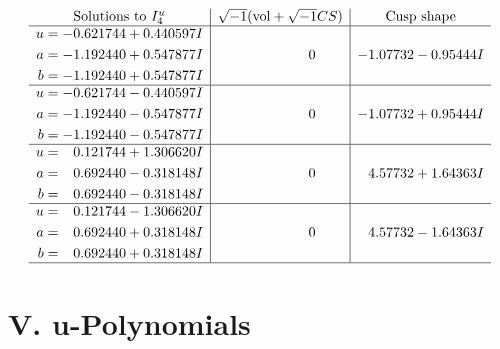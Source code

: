 \documentclass[1p]{elsarticle_modified}
\theoremstyle{definition}
\newcommand{\I}{\sqrt{-1}}
\begin{document}
$$\begin{array}{c|c|c}  
\text{Solutions to }I^u_{4}& \I (\text{vol} + \sqrt{-1}CS) & \text{Cusp shape}\\
 \hline 
\begin{aligned}
u &= -0.621744 + 0.440597 I \\
a &= -1.192440 + 0.547877 I \\
b &= -1.192440 + 0.547877 I\end{aligned}
 & \phantom{-0.000000 } 0 & -1.07732 - 0.95444 I \\ \hline\begin{aligned}
u &= -0.621744 - 0.440597 I \\
a &= -1.192440 - 0.547877 I \\
b &= -1.192440 - 0.547877 I\end{aligned}
 & \phantom{-0.000000 } 0 & -1.07732 + 0.95444 I \\ \hline\begin{aligned}
u &= \phantom{-}0.121744 + 1.306620 I \\
a &= \phantom{-}0.692440 - 0.318148 I \\
b &= \phantom{-}0.692440 - 0.318148 I\end{aligned}
 & \phantom{-0.000000 } 0 & \phantom{-}4.57732 + 1.64363 I \\ \hline\begin{aligned}
u &= \phantom{-}0.121744 - 1.306620 I \\
a &= \phantom{-}0.692440 + 0.318148 I \\
b &= \phantom{-}0.692440 + 0.318148 I\end{aligned}
 & \phantom{-0.000000 } 0 & \phantom{-}4.57732 - 1.64363 I\\
 \hline 
 \end{array}$$\newpage
\newpage\renewcommand{\arraystretch}{1}
\centering \section*{ V. u-Polynomials}
\end{document}
